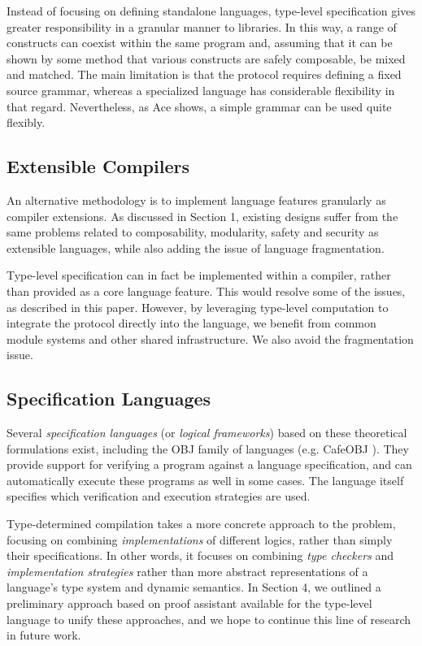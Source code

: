 \documentclass{llncs}
\begin{document}
Instead of focusing on defining standalone languages, type-level specification gives greater responsibility in a granular manner to libraries. In this way, a range of constructs can coexist within the same program and, assuming that it can be shown by some method that various constructs are safely composable, be mixed and matched. The main limitation is that the protocol requires defining a fixed source grammar, whereas a specialized language has considerable flexibility in that regard. Nevertheless, as Ace shows, a simple grammar can be used quite flexibly.
\subsection{Extensible Compilers}
An alternative methodology is to implement language features granularly as compiler extensions. As discussed in Section 1, existing designs suffer from the same problems related to composability, modularity\-, safety and security as extensible languages, while also adding the issue of language fragmentation.

Type-level specification can in fact be implemented within a compiler, rather than provided as a core language feature. This would resolve some of the issues, as described in this paper. However, by leveraging type-level computation to integrate the protocol directly into the language, we benefit from common module systems and other shared infrastructure. We also avoid the fragmentation issue.
\subsection{Specification Languages}
Several {\it specification languages} (or {\it logical frameworks}) based on these theoretical formulations exist, including the OBJ family of languages (e.g. CafeOBJ \cite{Diaconescu-Futatsugi01}). They provide support for verifying a program against a language specification, and can automatically execute these programs as well in some cases. The  language itself specifies which verification and execution strategies are used.

Type-determined compilation takes a more concrete approach to the problem, focusing on combining {\it implementations} of different\- logics, rather than simply their specifications. In other words, it focuses on combining {\it type checkers} and {\it implementation strategies} rather than more abstract representations of a language's type system and dynamic semantics. In Section 4, we outlined a preliminary approach based on proof assistant available for the type-level language to unify these approaches, and we hope to continue this line of research in future work.
\end{document}
